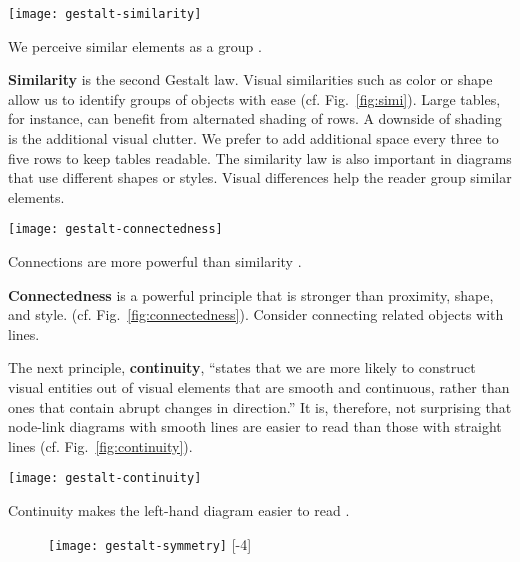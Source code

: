 \begin{marginfigure}
\centering
\texttt{[image: gestalt-similarity]}
\caption{\label{fig:simi} We perceive similar elements as a group \cite{Ware12}.}%
\end{marginfigure}

\textbf{Similarity} is the second Gestalt law. Visual similarities such as color or shape allow us to identify groups of objects with ease (cf. Fig.~\ref{fig:simi}). Large tables, for instance, can benefit from alternated shading of rows. A downside of shading is the additional visual clutter. We prefer to add additional space every three to five rows to keep tables readable. The similarity law is also important in diagrams that use different shapes or styles. Visual differences help the reader group similar elements.


\begin{marginfigure}
\centering
\texttt{[image: gestalt-connectedness]}
\caption{\label{fig:connectedness} Connections are more powerful than similarity \cite{Ware12}.}%
\end{marginfigure}

\textbf{Connectedness} is a powerful principle that is stronger than proximity, shape, and style.  (cf. Fig.~\ref{fig:connectedness}). Consider connecting related objects with lines.

The next principle, \textbf{continuity}, ``states that we are more likely to construct visual entities out of visual elements that are smooth and continuous, rather than ones that contain abrupt changes in direction.'' \cite{Ware12} It is, therefore, not surprising that node-link diagrams with smooth lines are easier to read than those with straight lines (cf. Fig.~\ref{fig:continuity}).

\begin{marginfigure}
\centering
\texttt{[image: gestalt-continuity]}
\caption{\label{fig:continuity} Continuity makes the left-hand diagram easier to read \cite{Ware12}.}%
\end{marginfigure}

\begin{figure}
\centering
\texttt{[image: gestalt-symmetry]}
[-4\baselineskip]
\end{figure}

